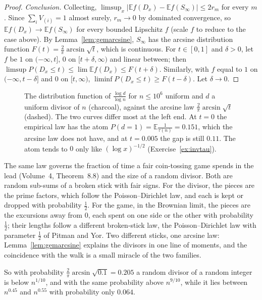 \begin{proof}
\emph{Conclusion.} Collecting, $\limsup_x|\mathbb Ef(D_x)-\mathbb Ef(S_\infty)|\le2r_m$ for every $m$. Since $\sum_iV_{(i)}=1$ almost surely, $r_m\to0$ by dominated convergence, so $\mathbb Ef(D_x)\to\mathbb Ef(S_\infty)$ for every bounded Lipschitz $f$ (scale $f$ to reduce to the case above). By Lemma~\ref{lem:gemarcsine}, $S_\infty$ has the arcsine distribution function $F(t)=\frac2\pi\arcsin\sqrt t$, which is continuous. For $t\in[0,1]$ and $\delta>0$, let $f$ be $1$ on $(-\infty,t]$, $0$ on $[t+\delta,\infty)$ and linear between; then $\limsup P(D_x\le t)\le\lim\mathbb Ef(D_x)\le F(t+\delta)$. Similarly, with $f$ equal to $1$ on $(-\infty,t-\delta]$ and $0$ on $[t,\infty)$, $\liminf P(D_x\le t)\ge F(t-\delta)$. Let $\delta\to0$.
\end{proof}

\begin{figure}[ht]
\centering{}
\caption{The distribution function of $\frac{\log d}{\log n}$ for $n\le10^6$ uniform and $d$ a uniform divisor of $n$ (charcoal), against the arcsine law $\frac2\pi\arcsin\sqrt t$ (dashed). The two curves differ most at the left end. At $t=0$ the empirical law has the atom $P(d=1)=\mathbb E\frac1{\tau(n)}=0.151$, which the arcsine law does not have, and at $t=0.005$ the gap is still $0.11$. The atom tends to $0$ only like $(\log x)^{-1/2}$ (Exercise~\ref{ex:invtau}).}
\label{fig:arcsine}
\end{figure}

\begin{beauty}
The same law governs the fraction of time a fair coin-tossing game spends in the lead (Volume~4, Theorem~8.8) and the size of a random divisor. Both are random sub-sums of a broken stick with fair signs. For the divisor, the pieces are the prime factors, which follow the Poisson--Dirichlet law, and each is kept or dropped with probability $\frac12$. For the game, in the Brownian limit, the pieces are the excursions away from $0$, each spent on one side or the other with probability $\frac12$; their lengths follow a different broken-stick law, the Poisson--Dirichlet law with parameter $\frac12$ of Pitman and Yor. Two different sticks, one arcsine law: Lemma~\ref{lem:gemarcsine} explains the divisors in one line of moments, and the coincidence with the walk is a small miracle of the two families.
\end{beauty}

So with probability $\frac2\pi\arcsin\sqrt{0.1}=0.205$ a random divisor of a random integer is below $n^{1/10}$, and with the same probability above $n^{9/10}$, while it lies between $n^{0.45}$ and $n^{0.55}$ with probability only $0.064$.

